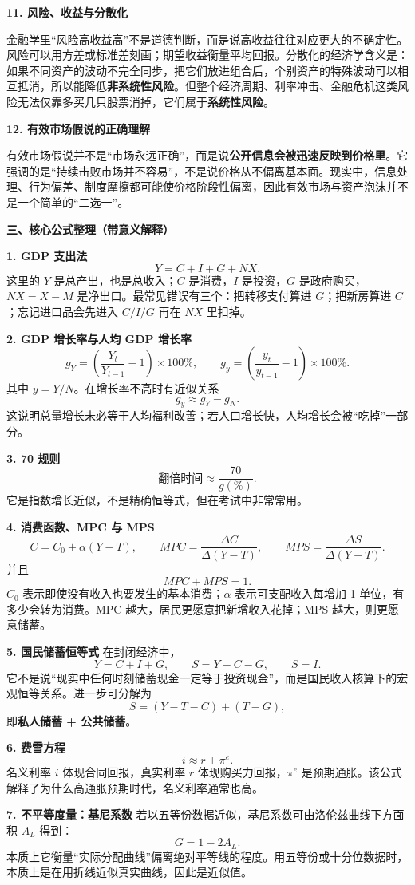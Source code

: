\textbf{11. 风险、收益与分散化}

金融学里“风险高收益高”不是道德判断，而是说高收益往往对应更大的不确定性。风险可以用方差或标准差刻画；期望收益衡量平均回报。分散化的经济学含义是：如果不同资产的波动不完全同步，把它们放进组合后，个别资产的特殊波动可以相互抵消，所以能降低\textbf{非系统性风险}。但整个经济周期、利率冲击、金融危机这类风险无法仅靠多买几只股票消掉，它们属于\textbf{系统性风险}。

\textbf{12. 有效市场假说的正确理解}

有效市场假说并不是“市场永远正确”，而是说\textbf{公开信息会被迅速反映到价格里}。它强调的是“持续击败市场并不容易”，不是说价格从不偏离基本面。现实中，信息处理、行为偏差、制度摩擦都可能使价格阶段性偏离，因此有效市场与资产泡沫并不是一个简单的“二选一”。

\textbf{三、核心公式整理（带意义解释）}

\textbf{1. GDP 支出法}
\[
Y=C+I+G+NX.
\]
这里的 $Y$ 是总产出，也是总收入；$C$ 是消费，$I$ 是投资，$G$ 是政府购买，$NX=X-M$ 是净出口。最常见错误有三个：把转移支付算进 $G$；把新房算进 $C$；忘记进口品会先进入 $C/I/G$ 再在 $NX$ 里扣掉。

\textbf{2. GDP 增长率与人均 GDP 增长率}
\[
g_Y=\left(\frac{Y_t}{Y_{t-1}}-1\right)\times 100\%,\qquad
g_y=\left(\frac{y_t}{y_{t-1}}-1\right)\times 100\%.
\]
其中 $y=Y/N$。在增长率不高时有近似关系
\[
g_y \approx g_Y-g_N.
\]
这说明总量增长未必等于人均福利改善；若人口增长快，人均增长会被“吃掉”一部分。

\textbf{3. 70 规则}
\[
\text{翻倍时间} \approx \frac{70}{g(\%)}.
\]
它是指数增长近似，不是精确恒等式，但在考试中非常常用。

\textbf{4. 消费函数、MPC 与 MPS}
\[
C=C_0+\alpha(Y-T),\qquad MPC=\frac{\Delta C}{\Delta(Y-T)},\qquad MPS=\frac{\Delta S}{\Delta(Y-T)}.
\]
并且
\[
MPC+MPS=1.
\]
$C_0$ 表示即使没有收入也要发生的基本消费；$\alpha$ 表示可支配收入每增加 1 单位，有多少会转为消费。MPC 越大，居民更愿意把新增收入花掉；MPS 越大，则更愿意储蓄。

\textbf{5. 国民储蓄恒等式}
在封闭经济中，
\[
Y=C+I+G,\qquad S=Y-C-G,\qquad S=I.
\]
它不是说“现实中任何时刻储蓄现金一定等于投资现金”，而是国民收入核算下的宏观恒等关系。进一步可分解为
\[
S=(Y-T-C)+(T-G),
\]
即\textbf{私人储蓄 + 公共储蓄}。

\textbf{6. 费雪方程}
\[
i \approx r+\pi^e.
\]
名义利率 $i$ 体现合同回报，真实利率 $r$ 体现购买力回报，$\pi^e$ 是预期通胀。该公式解释了为什么高通胀预期时代，名义利率通常也高。

\textbf{7. 不平等度量：基尼系数}
若以五等份数据近似，基尼系数可由洛伦兹曲线下方面积 $A_L$ 得到：
\[
G=1-2A_L.
\]
本质上它衡量“实际分配曲线”偏离绝对平等线的程度。用五等份或十分位数据时，本质上是在用折线近似真实曲线，因此是近似值。

